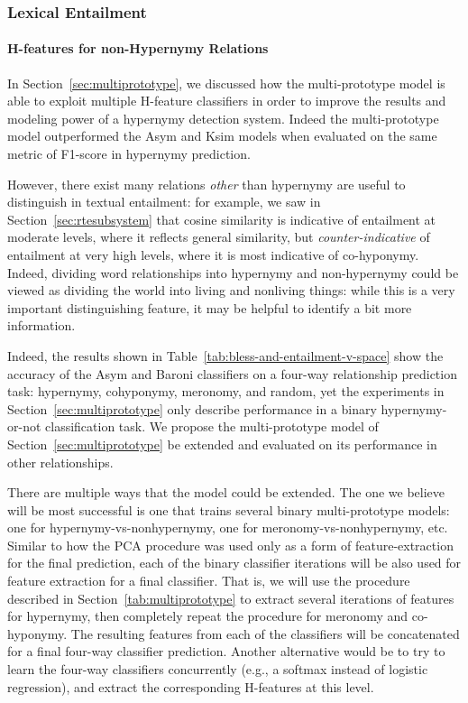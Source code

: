 \documentclass[letterpaper]{article}
\begin{document}
\subsubsection{Lexical Entailment}

\paragraph{H-features for non-Hypernymy Relations}

In Section~\ref{sec:multiprototype}, we discussed how the multi-prototype model
is able to exploit multiple H-feature classifiers in order to improve the results
and modeling power of a hypernymy detection system. Indeed the multi-prototype
model outperformed the Asym and Ksim models when evaluated on the same metric of
F1-score in hypernymy prediction.

However, there exist many relations {\em other} than hypernymy are useful to
distinguish in textual entailment: for example, we saw in
Section~\ref{sec:rtesubsystem} that cosine similarity is indicative of entailment
at moderate levels, where it reflects general similarity, but {\em counter-indicative}
of entailment at very high levels, where it is most indicative of co-hyponymy.
Indeed, dividing word relationships into hypernymy and non-hypernymy could be
viewed as dividing the world into living and nonliving things: while this is
a very important distinguishing feature, it may be helpful to identify a bit more
information.

Indeed, the results shown in Table~\ref{tab:bless-and-entailment-v-space} show
the accuracy of the Asym and Baroni classifiers on a four-way relationship
prediction task: hypernymy, cohyponymy, meronomy, and random, yet the
experiments in Section~\ref{sec:multiprototype} only describe performance in a
binary hypernymy-or-not classification task. We propose the multi-prototype
model of Section~\ref{sec:multiprototype} be extended and evaluated on its
performance in other relationships.

There are multiple ways that the model could be extended. The one we believe
will be most successful is one that trains several binary multi-prototype models:
one for hypernymy-vs-nonhypernymy, one for meronomy-vs-nonhypernymy, etc.
Similar to how the PCA procedure was used only as a form of feature-extraction
for the final prediction, each of the binary classifier iterations will be also
used for feature extraction for a final classifier.
That is, we will use the procedure described in Section~\ref{tab:multiprototype}
to extract several iterations of features for hypernymy, then completely repeat
the procedure for meronomy and co-hyponymy. The resulting features from each
of the classifiers will be concatenated for a final four-way classifier prediction.
Another alternative would be to try to learn the four-way classifiers concurrently
(e.g., a softmax instead of logistic regression), and extract the corresponding
H-features at this level.
\end{document}
